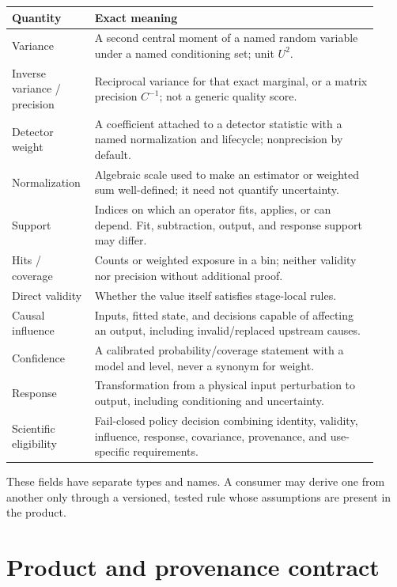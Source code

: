 \documentclass[11pt]{article}
\begin{document}
\begin{longtable}{>{\raggedright\arraybackslash}p{0.18\linewidth}
                  >{\raggedright\arraybackslash}p{0.74\linewidth}}
\toprule
Quantity & Exact meaning \\
\midrule
\endhead
Variance & A second central moment of a named random variable under a named
conditioning set; unit $U^2$.\\
Inverse variance / precision & Reciprocal variance for that exact marginal,
or a matrix precision $C^{-1}$; not a generic quality score.\\
Detector weight & A coefficient attached to a detector statistic with a named
normalization and lifecycle; nonprecision by default.\\
Normalization & Algebraic scale used to make an estimator or weighted sum
well-defined; it need not quantify uncertainty.\\
Support & Indices on which an operator fits, applies, or can depend.  Fit,
subtraction, output, and response support may differ.\\
Hits / coverage & Counts or weighted exposure in a bin; neither validity nor
precision without additional proof.\\
Direct validity & Whether the value itself satisfies stage-local rules.\\
Causal influence & Inputs, fitted state, and decisions capable of affecting an
output, including invalid/replaced upstream causes.\\
Confidence & A calibrated probability/coverage statement with a model and
level, never a synonym for weight.\\
Response & Transformation from a physical input perturbation to output,
including conditioning and uncertainty.\\
Scientific eligibility & Fail-closed policy decision combining identity,
validity, influence, response, covariance, provenance, and use-specific
requirements.\\
\bottomrule
\end{longtable}

These fields have separate types and names.  A consumer may derive one from
another only through a versioned, tested rule whose assumptions are present
in the product.

\section{Product and provenance contract}
\label{sec:products}
\end{document}
